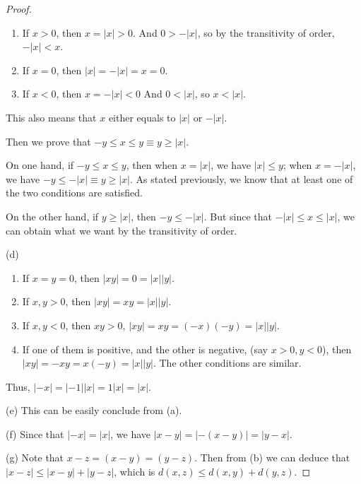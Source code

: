 \begin{proof}
\begin{enumerate}
\item If $x>0$, then $x=|x|>0$. And $0>-|x|$, so by the transitivity of order, $-|x| < x$.
\item If $x=0$, then $|x|=-|x| = x=0$.
\item If $x<0$, then $x=-|x|<0$ And $0<|x|$, so $x<|x|$.
\end{enumerate}
This also means that $x$ either equals to $|x|$ or $-|x|$.

Then we prove that $-y \leq x \leq y \equiv y \geq |x|$.

On one hand, if $-y \leq x \leq y$, then when $x=|x|$, we have $|x| \leq y$; when $x=-|x|$, we have 
$-y \leq -|x| \equiv y \geq |x|$. As stated previously, we know that at least one of the two conditions 
are satisfied.

On the other hand, if $y \geq |x|$, then $-y \leq -|x|$. But since that $-|x| \leq x \leq |x|$, we can 
obtain what we want by the transitivity of order.

(d)
\begin{enumerate}
\item If $x=y=0$, then $|xy| = 0 = |x||y|$.
\item If $x,y>0$, then $|xy| = xy = |x||y|$.
\item If $x,y<0$, then $xy>0$, $|xy| = xy = (-x)(-y) = |x||y|$.
\item If one of them is positive, and the other is negative, (say $x>0,y<0$), then 
$|xy|=-xy=x(-y)=|x||y|$. The other conditions are similar.
\end{enumerate}

Thus, $|-x| = |-1||x| = 1|x| = |x|$.

(e)
This can be easily conclude from (a).

(f)
Since that $|-x|=|x|$, we have $|x-y| = |-(x-y)| = |y-x|$.

(g)
Note that $x-z = (x-y) = (y-z)$. Then from (b) we can deduce that $|x-z| \leq |x-y| + |y-z|$, which is 
$d(x,z) \leq d(x,y) + d(y,z)$.
\end{proof}

